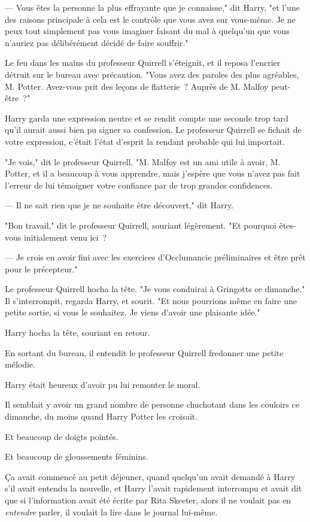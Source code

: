 --- Vous êtes la personne la plus effrayante que je connaisse," dit Harry, "et l'une des raisons principale à cela est le contrôle que vous avez sur vous-même. Je ne peux tout simplement pas vous imaginer faisant du mal à quelqu'un que vous n'auriez pas délibérément décidé de faire souffrir."

Le feu dans les mains du professeur Quirrell s'éteignit, et il reposa l'encrier détruit sur le bureau avec précaution. "Vous avez des paroles des plus agréables, M. Potter. Avez-vous prit des leçons de flatterie~? Auprès de M. Malfoy peut-être~?"

Harry garda une expression neutre et se rendit compte une seconde trop tard qu'il aurait aussi bien pu signer sa confession. Le professeur Quirrell se fichait de votre expression, c'était l'état d'esprit la rendant probable qui lui importait.

"Je vois," dit le professeur Quirrell. "M. Malfoy est un ami utile à avoir, M. Potter, et il a beaucoup à vous apprendre, mais j'espère que vous n'avez pas fait l'erreur de lui témoigner votre confiance par de trop grandes confidences.

--- Il ne sait rien que je ne souhaite être découvert," dit Harry.

"Bon travail," dit le professeur Quirrell, souriant légèrement. "Et pourquoi êtes-vous initialement venu ici~?

--- Je crois en avoir fini avec les exercices d'Occlumancie préliminaires et être prêt pour le précepteur."

Le professeur Quirrell hocha la tête. "Je vous conduirai à Gringotts ce dimanche." Il s'interrompit, regarda Harry, et sourit. "Et nous pourrions même en faire une petite sortie, si vous le souhaitez. Je viens d'avoir une plaisante idée."

Harry hocha la tête, souriant en retour.

En sortant du bureau, il entendit le professeur Quirrell fredonner une petite mélodie.

Harry était heureux d'avoir pu lui remonter le moral.

\later

Il semblait y avoir un grand nombre de personne chuchotant dans les couloirs ce dimanche, du moins quand Harry Potter les croisait.

Et beaucoup de doigts pointés.

Et beaucoup de gloussements féminins.

Ça avait commencé au petit déjeuner, quand quelqu'un avait demandé à Harry s'il avait entendu la nouvelle, et Harry l'avait rapidement interrompu et avait dit que si l'information avait été écrite par Rita Skeeter, alors il ne voulait pas en \emph{entendre} parler, il voulait la lire dans le journal lui-même.

